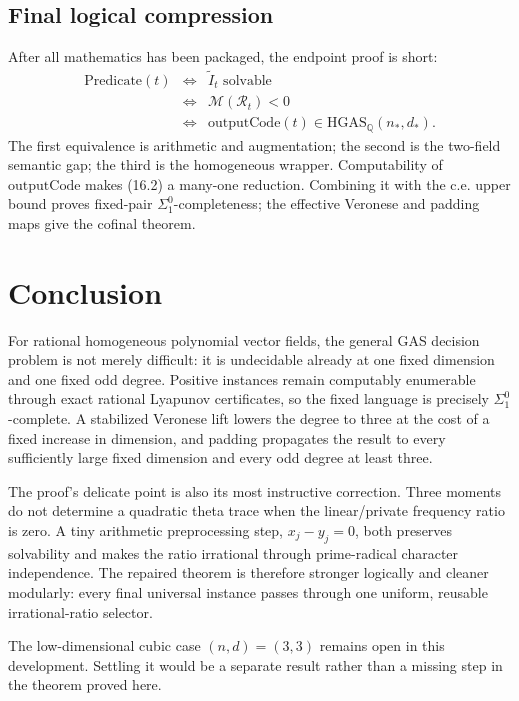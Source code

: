 \documentclass[11pt]{article}
\newcommand{\Q}{\mathbb Q}
\newcommand{\HGAS}{\mathrm{HGAS}}
\begin{document}
\subsection{Final logical compression}

After all mathematics has been packaged, the endpoint proof is short:
\[
\begin{array}{rcl}
\mathrm{Predicate}(t)
 &\Longleftrightarrow&
 \widetilde I_t\text{ solvable}\\
 &\Longleftrightarrow&
 \mathcal M(\mathcal R_t)<0\\
 &\Longleftrightarrow&
 \mathrm{outputCode}(t)\in
       \HGAS_{\Q}(n_\ast,d_\ast).
\end{array}
\tag{16.2}
\]
The first equivalence is arithmetic and augmentation; the second is the
two-field semantic gap; the third is the homogeneous wrapper.  Computability
of \(\mathrm{outputCode}\) makes (16.2) a many-one reduction.  Combining it
with the c.e. upper bound proves fixed-pair \(\Sigma^0_1\)-completeness;
the effective Veronese and padding maps give the cofinal theorem.

\section{Conclusion}

For rational homogeneous polynomial vector fields, the general GAS
decision problem is not merely difficult: it is undecidable already at one
fixed dimension and one fixed odd degree.  Positive instances remain
computably enumerable through exact rational Lyapunov certificates, so the
fixed language is precisely \(\Sigma^0_1\)-complete.  A stabilized
Veronese lift lowers the degree to three at the cost of a fixed increase in
dimension, and padding propagates the result to every sufficiently large
fixed dimension and every odd degree at least three.

The proof's delicate point is also its most instructive correction.  Three
moments do not determine a quadratic theta trace when the linear/private
frequency ratio is zero.  A tiny arithmetic preprocessing step,
\(x_j-y_j=0\), both preserves solvability and makes the ratio irrational
through prime-radical character independence.  The repaired theorem is
therefore stronger logically and cleaner modularly: every final universal
instance passes through one uniform, reusable irrational-ratio selector.

The low-dimensional cubic case \((n,d)=(3,3)\) remains open in this
development.  Settling it would be a separate result rather than a missing
step in the theorem proved here.
\end{document}
